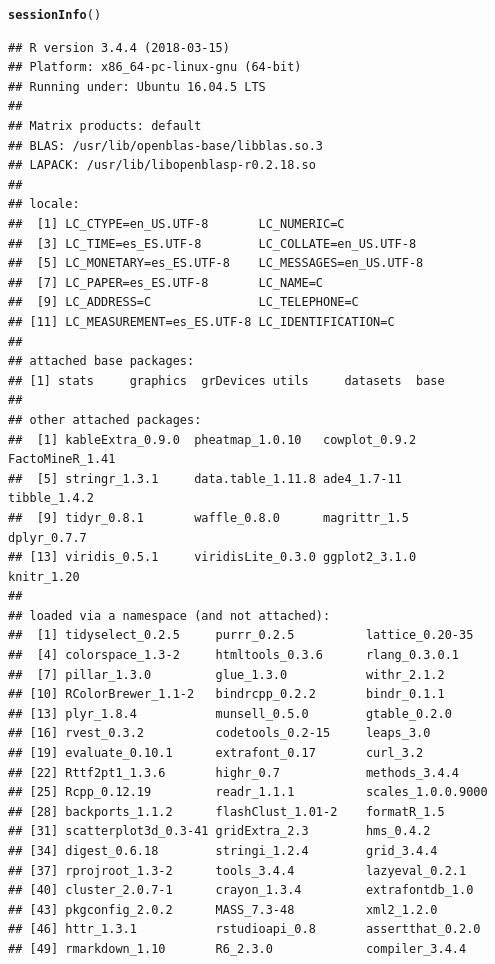 \documentclass{article}\usepackage[]{graphicx}\usepackage[]{color}
\makeatletter
\newcommand{\hlstd}[1]{\textcolor[rgb]{0.345,0.345,0.345}{#1}}%
\newcommand{\hlkwd}[1]{\textcolor[rgb]{0.737,0.353,0.396}{\textbf{#1}}}%
\newenvironment{kframe}{%
 \def\at@end@of@kframe{}%
 \ifinner\ifhmode%
  \def\at@end@of@kframe{\end{minipage}}%
  \begin{minipage}{\columnwidth}%
 \fi\fi%
 \def\FrameCommand##1{\hskip\@totalleftmargin \hskip-\fboxsep
 \colorbox{shadecolor}{##1}\hskip-\fboxsep
     \hskip-\linewidth \hskip-\@totalleftmargin \hskip\columnwidth}%
 \MakeFramed {\advance\hsize-\width
   \@totalleftmargin\z@ \linewidth\hsize
   \@setminipage}}%
 {\par\unskip\endMakeFramed%
 \at@end@of@kframe}
\newenvironment{knitrout}{}{} %
\makeatother
\begin{document}
\begin{knitrout}
\color{fgcolor}\begin{kframe}
\begin{alltt}
\hlkwd{sessionInfo}\hlstd{()}
\end{alltt}
\begin{verbatim}
## R version 3.4.4 (2018-03-15)
## Platform: x86_64-pc-linux-gnu (64-bit)
## Running under: Ubuntu 16.04.5 LTS
## 
## Matrix products: default
## BLAS: /usr/lib/openblas-base/libblas.so.3
## LAPACK: /usr/lib/libopenblasp-r0.2.18.so
## 
## locale:
##  [1] LC_CTYPE=en_US.UTF-8       LC_NUMERIC=C              
##  [3] LC_TIME=es_ES.UTF-8        LC_COLLATE=en_US.UTF-8    
##  [5] LC_MONETARY=es_ES.UTF-8    LC_MESSAGES=en_US.UTF-8   
##  [7] LC_PAPER=es_ES.UTF-8       LC_NAME=C                 
##  [9] LC_ADDRESS=C               LC_TELEPHONE=C            
## [11] LC_MEASUREMENT=es_ES.UTF-8 LC_IDENTIFICATION=C       
## 
## attached base packages:
## [1] stats     graphics  grDevices utils     datasets  base     
## 
## other attached packages:
##  [1] kableExtra_0.9.0  pheatmap_1.0.10   cowplot_0.9.2     FactoMineR_1.41  
##  [5] stringr_1.3.1     data.table_1.11.8 ade4_1.7-11       tibble_1.4.2     
##  [9] tidyr_0.8.1       waffle_0.8.0      magrittr_1.5      dplyr_0.7.7      
## [13] viridis_0.5.1     viridisLite_0.3.0 ggplot2_3.1.0     knitr_1.20       
## 
## loaded via a namespace (and not attached):
##  [1] tidyselect_0.2.5     purrr_0.2.5          lattice_0.20-35     
##  [4] colorspace_1.3-2     htmltools_0.3.6      rlang_0.3.0.1       
##  [7] pillar_1.3.0         glue_1.3.0           withr_2.1.2         
## [10] RColorBrewer_1.1-2   bindrcpp_0.2.2       bindr_0.1.1         
## [13] plyr_1.8.4           munsell_0.5.0        gtable_0.2.0        
## [16] rvest_0.3.2          codetools_0.2-15     leaps_3.0           
## [19] evaluate_0.10.1      extrafont_0.17       curl_3.2            
## [22] Rttf2pt1_1.3.6       highr_0.7            methods_3.4.4       
## [25] Rcpp_0.12.19         readr_1.1.1          scales_1.0.0.9000   
## [28] backports_1.1.2      flashClust_1.01-2    formatR_1.5         
## [31] scatterplot3d_0.3-41 gridExtra_2.3        hms_0.4.2           
## [34] digest_0.6.18        stringi_1.2.4        grid_3.4.4          
## [37] rprojroot_1.3-2      tools_3.4.4          lazyeval_0.2.1      
## [40] cluster_2.0.7-1      crayon_1.3.4         extrafontdb_1.0     
## [43] pkgconfig_2.0.2      MASS_7.3-48          xml2_1.2.0          
## [46] httr_1.3.1           rstudioapi_0.8       assertthat_0.2.0    
## [49] rmarkdown_1.10       R6_2.3.0             compiler_3.4.4
\end{verbatim}
\end{kframe}
\end{knitrout}
\end{document}
